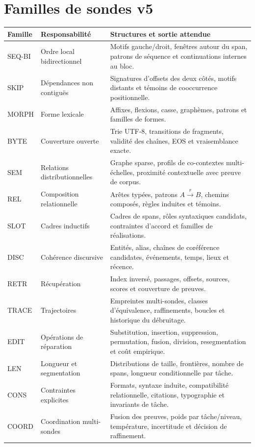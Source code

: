 \documentclass[11pt,a4paper,oneside]{report}
\begin{document}
\chapter{Familles de sondes v5}
\begin{longtable}{p{2.2cm}p{4.0cm}p{7.6cm}}
\toprule Famille & Responsabilité & Structures et sortie attendue\\
\midrule
SEQ-BI & Ordre local bidirectionnel & Motifs gauche/droit, fenêtres autour du span, patrons de séquence et continuations internes au bloc.\\
SKIP & Dépendances non contiguës & Signatures d'offsets des deux côtés, motifs distants et témoins de cooccurrence positionnelle.\\
MORPH & Forme lexicale & Affixes, flexions, casse, graphèmes, patrons et familles de formes.\\
BYTE & Couverture ouverte & Trie UTF-8, transitions de fragments, validité des chaînes, EOS et vraisemblance exacte.\\
SEM & Relations distributionnelles & Graphe sparse, profils de co-contextes multi-échelles, proximité contextuelle avec preuve de corpus.\\
REL & Composition relationnelle & Arêtes typées, patrons $A\!\xrightarrow{r}\!B$, chemins composés, règles induites et témoins.\\
SLOT & Cadres inductifs & Cadres de spans, rôles syntaxiques candidats, contraintes d'accord et familles de réalisations.\\
DISC & Cohérence discursive & Entités, alias, chaînes de coréférence candidates, événements, temps, lieux et récence.\\
RETR & Récupération & Index inversé, passages, offsets, sources, scores et couverture de preuves.\\
TRACE & Trajectoires & Empreintes multi-sondes, classes d'équivalence, raffinements, boucles et historique du débruitage.\\
EDIT & Opérations de réparation & Substitution, insertion, suppression, permutation, fusion, division, resegmentation et coût empirique.\\
LEN & Longueur et segmentation & Distributions de taille, frontières, nombre de spans, longueur conditionnelle par tâche.\\
CONS & Contraintes explicites & Formats, syntaxe induite, compatibilité relationnelle, citations, typographie et invariants de tâche.\\
COORD & Coordination multi-sondes & Fusion des preuves, poids par tâche/niveau, température, incertitude et décision de raffinement.\\
\bottomrule
\end{longtable}
\end{document}
